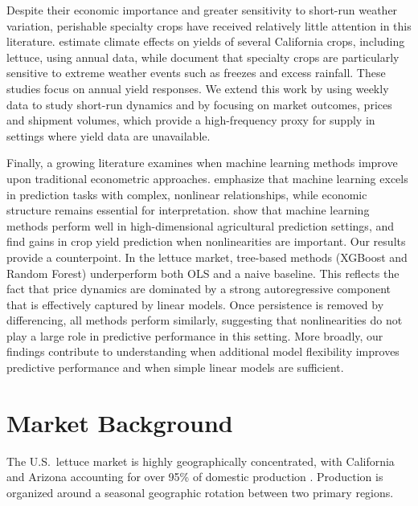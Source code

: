 \documentclass[12pt]{article}
\begin{document}
Despite their economic importance and greater sensitivity to short-run weather variation, perishable specialty crops have received relatively little attention in this literature. \citet{lobell2007california} estimate climate effects on yields of several California crops, including lettuce, using annual data, while \citet{kistner2018vulnerability} document that specialty crops are particularly sensitive to extreme weather events such as freezes and excess rainfall. These studies focus on annual yield responses. We extend this work by using weekly data to study short-run dynamics and by focusing on market outcomes, prices and shipment volumes, which provide a high-frequency proxy for supply in settings where yield data are unavailable.

Finally, a growing literature examines when machine learning methods improve upon traditional econometric approaches. \citet{mullainathan2017machine} emphasize that machine learning excels in prediction tasks with complex, nonlinear relationships, while economic structure remains essential for interpretation. \citet{storm2020machine} show that machine learning methods perform well in high-dimensional agricultural prediction settings, and \citet{crane2018machine} find gains in crop yield prediction when nonlinearities are important. Our results provide a counterpoint. In the lettuce market, tree-based methods (XGBoost and Random Forest) underperform both OLS and a naive baseline. This reflects the fact that price dynamics are dominated by a strong autoregressive component that is effectively captured by linear models. Once persistence is removed by differencing, all methods perform similarly, suggesting that nonlinearities do not play a large role in predictive performance in this setting. More broadly, our findings contribute to understanding when additional model flexibility improves predictive performance and when simple linear models are sufficient.

\section{Market Background}
\label{sec:background}

The U.S.\ lettuce market is highly geographically concentrated, with California and Arizona accounting for over 95\% of domestic production \citep{usda_nass_vegetables}. Production is organized around a seasonal geographic rotation between two primary regions.
\end{document}

